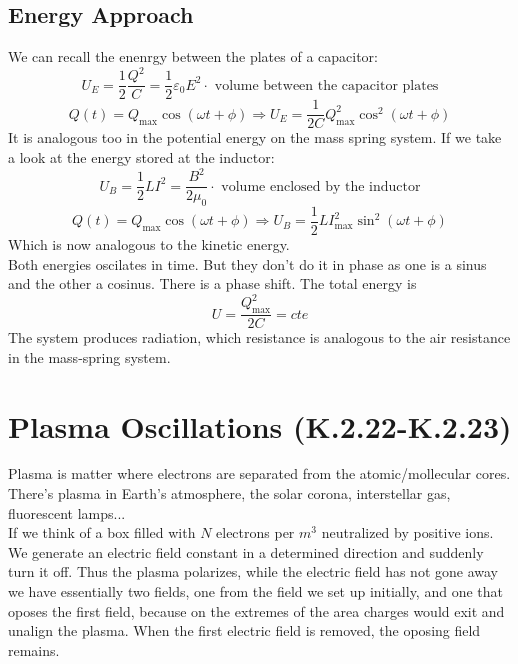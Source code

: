 \documentclass{report}
\begin{document}
          \subsection{Energy Approach}
            \noindent We can recall the enenrgy between the plates of a capacitor:
            \[U_E=\dfrac{1}{2}\dfrac{Q^2}{C}=\dfrac12\varepsilon_0 E^2\cdot \text{ volume between the capacitor plates}\]
            \[Q(t)=Q_\text{max}\cos(\omega t+\phi)\Longrightarrow U_E=\dfrac{1}{2C}Q^2_\text{max}\cos^2(\omega t+\phi)\]
            \noindent It is analogous too in the potential energy on the mass spring system. If we take a look at the energy stored at the inductor:
            \[U_B=\dfrac{1}{2}LI^2=\dfrac{B^2}{2\mu_0}\cdot \text{ volume enclosed by the inductor}\]
            \[Q(t)=Q_\text{max}\cos(\omega t+\phi)\Longrightarrow U_B=\dfrac{1}{2}LI^2_\text{max}\sin^2(\omega t+\phi)\]
            \noindent Which is now analogous to the kinetic energy.\\

            \noindent Both energies oscilates in time. But they don't do it in phase as one is a sinus and the other a cosinus. There is a phase shift. The total energy is
            \begin{equation}
             \boxed{ U=\dfrac{Q_\text{max}^2}{2C}=cte}
            \end{equation}
            \noindent The system produces radiation, which resistance is analogous to the air resistance in the mass-spring system.
      \section{Plasma Oscillations (K.2.22-K.2.23)}
        \noindent Plasma is matter where electrons are separated from the atomic/mollecular cores. There's plasma in Earth's atmosphere, the solar corona, interstellar gas, fluorescent lamps... \\

        \noindent If we think of a box filled with $N$ electrons per $m^3$ neutralized by positive ions. We generate an electric field constant in a determined direction and suddenly turn it off. Thus the plasma polarizes, while the electric field has not gone away we have essentially two fields, one from the field we set up initially, and one that oposes the first field, because on the extremes of the area charges would exit and unalign the plasma. When the first electric field is removed, the oposing field remains.\\
\end{document}
